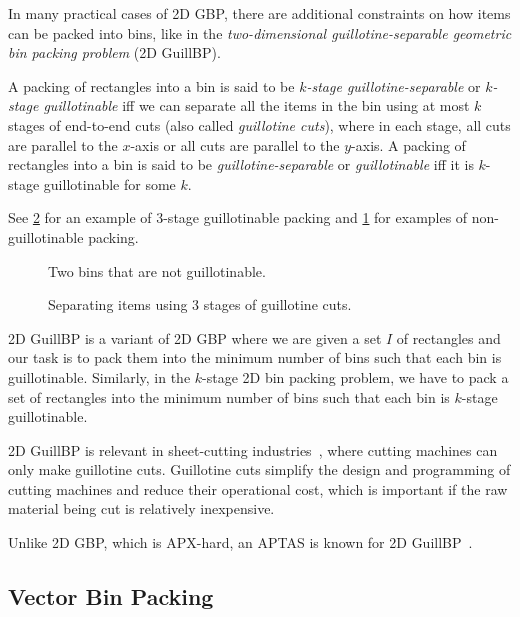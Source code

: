 In many practical cases of 2D GBP, there are additional constraints on
how items can be packed into bins, like in the
\emph{two-dimensional guillotine-separable geometric bin packing problem} (2D GuillBP).

\begin{definition}
A packing of rectangles into a bin is said to be
\emph{$k$-stage guillotine-separable} or \emph{$k$-stage guillotinable}
iff we can separate all the items in the bin using at most $k$ stages of end-to-end cuts
(also called \emph{guillotine cuts}), where in each stage,
all cuts are parallel to the $x$-axis or all cuts are parallel to the $y$-axis.
A packing of rectangles into a bin is said to be \emph{guillotine-separable}
or \emph{guillotinable} iff it is $k$-stage guillotinable for some $k$.
\end{definition}

See \cref{fig:guill-example} for an example of 3-stage guillotinable packing
and \cref{fig:non-guill-examples} for examples of non-guillotinable packing.

\begin{figure}[htb]
\centering

\caption{Two bins that are not guillotinable.}
\label{fig:non-guill-examples}
\end{figure}
\begin{figure}[htb]
\centering

\caption{Separating items using 3 stages of guillotine cuts.}
\label{fig:guill-example}
\end{figure}

2D GuillBP is a variant of 2D GBP where we are given a set $I$ of rectangles and
our task is to pack them into the minimum number of bins such that each bin is guillotinable.
Similarly, in the $k$-stage 2D bin packing problem, we have to pack a set of rectangles
into the minimum number of bins such that each bin is $k$-stage guillotinable.

2D GuillBP is relevant in sheet-cutting
industries~\cite{mchale1999cutting,puchinger2004solving,schneider1988trim},
where cutting machines can only make guillotine cuts.
Guillotine cuts simplify the design and programming of cutting machines
and reduce their operational cost, which is important if
the raw material being cut is relatively inexpensive.

Unlike 2D GBP, which is APX-hard, an APTAS is known for 2D GuillBP~\cite{bansal2005tale}.

\subsection{Vector Bin Packing}

